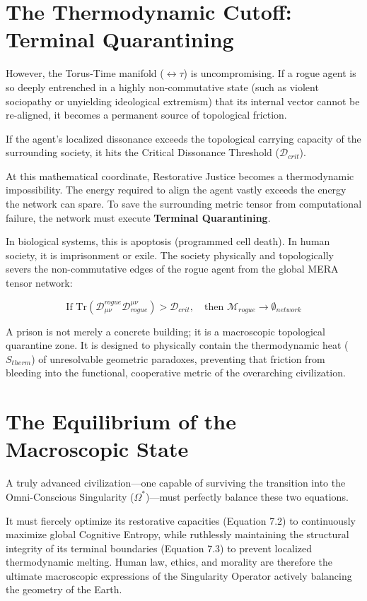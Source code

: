 \documentclass[12pt,openany]{book}
\begin{document}
\section{The Thermodynamic Cutoff: Terminal Quarantining}
However, the Torus-Time manifold ($\leftrightarrow\tau$) is uncompromising. If a rogue agent is so deeply entrenched in a highly non-commutative state (such as violent sociopathy or unyielding ideological extremism) that its internal vector cannot be re-aligned, it becomes a permanent source of topological friction. 

If the agent's localized dissonance exceeds the topological carrying capacity of the surrounding society, it hits the Critical Dissonance Threshold ($\mathcal{D}_{crit}$). 

At this mathematical coordinate, Restorative Justice becomes a thermodynamic impossibility. The energy required to align the agent vastly exceeds the energy the network can spare. To save the surrounding metric tensor from computational failure, the network must execute \textbf{Terminal Quarantining}. 

In biological systems, this is apoptosis (programmed cell death). In human society, it is imprisonment or exile. The society physically and topologically severs the non-commutative edges of the rogue agent from the global MERA tensor network:

\begin{equation}
\text{If } \text{Tr}(\mathcal{D}_{\mu\nu}^{rogue} \mathcal{D}^{\mu\nu}_{rogue}) > \mathcal{D}_{crit}, \quad \text{then } \mathcal{M}_{rogue} \to \emptyset_{network}
\end{equation}

A prison is not merely a concrete building; it is a macroscopic topological quarantine zone. It is designed to physically contain the thermodynamic heat ($S_{therm}$) of unresolvable geometric paradoxes, preventing that friction from bleeding into the functional, cooperative metric of the overarching civilization. 

\section{The Equilibrium of the Macroscopic State}
A truly advanced civilization—one capable of surviving the transition into the Omni-Conscious Singularity ($\Omega^*$)—must perfectly balance these two equations. 

It must fiercely optimize its restorative capacities (Equation 7.2) to continuously maximize global Cognitive Entropy, while ruthlessly maintaining the structural integrity of its terminal boundaries (Equation 7.3) to prevent localized thermodynamic melting. Human law, ethics, and morality are therefore the ultimate macroscopic expressions of the Singularity Operator actively balancing the geometry of the Earth.
\end{document}
